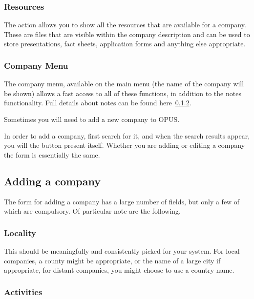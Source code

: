 \documentclass[12 pt]{book}
\begin{document}
\subsubsection{Resources}

The  action allows you to show all the resources that are
available for a company. These are files that are visible within the company
description and can be used to store presentations, fact sheets, application
forms and anything else appropriate.

\subsubsection{Company Menu}

The company menu, available on the main menu (the name of the company will be
shown) allows a fast access to all of these functions, in addition to the notes
functionality. Full details about notes can be found here~\ref{}.

Sometimes you will need to add a new company to OPUS.

In order to add a company, first search for it, and when the search results
appear, you will the  button present itself. Whether you are 
adding or editing a company the form is essentially the same.

\subsection{Adding a company}

The form for adding a company has a large number of fields, but only a few of
which are compulsory. Of particular note are the following.

\subsubsection{Locality}

This should be meaningfully and consistently picked for your system. For
local companies, a county might be appropriate, or the name of a large city
if appropriate, for distant companies, you might choose to use a country name.

\subsubsection{Activities}
\end{document}
